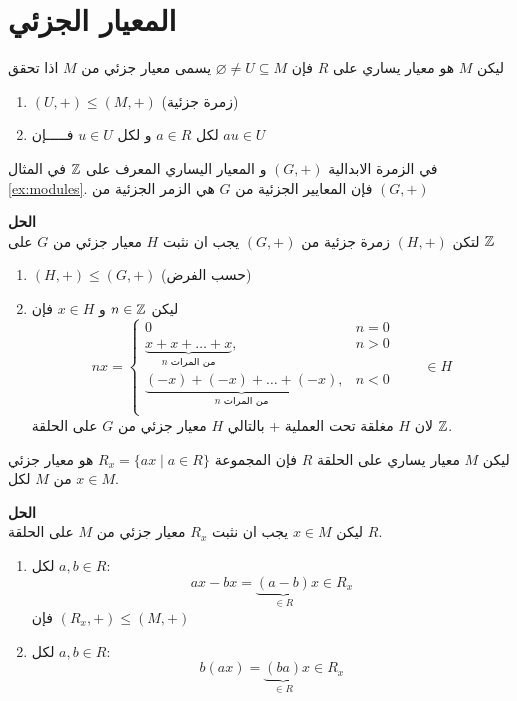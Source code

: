 \section{المعيار الجزئي}
\begin{definition}
  ليكن $M$ هو معيار يساري على $R$ فإن $\varnothing\neq U\subseteq M$ يسمى معيار جزئي من $M$ اذا تحقق
  \begin{enumerate}
  	\item $(U, +) \leq (M, +)$ (زمرة جزئية)
  	\item  لكل $a\in R$ و لكل $u\in U$ فـــــإن $au\in U$
  \end{enumerate}
\end{definition}

\begin{example}\label{ex:submodules}
	في الزمرة الابدالية $(G,+)$ و المعيار اليساري المعرف على $\mathbb{Z}$ في المثال \ref{ex:modules}. فإن المعايير الجزئية من $G$ هي الزمر الجزئية من $(G,+)$
	\end{example}
	\noindent
	\textbf{الحل}\\
	\noindent
	لتكن $(H,+)$ زمرة جزئية من $(G,+)$ يجب ان نثبت $H$ معيار جزئي من $G$ على $\mathbb{Z}$  
	\begin{enumerate}
		\item $(H, +) \leq (G, +)$ (حسب الفرض)
		\item ليكن $n\in\mathbb{Z}$ و $x\in H$ فإن 
		\[
		nx = 
		\begin{cases}
			0 & n=0 \\
			\underbrace{x+x+\dots+x}_{\text{$n$ من المرات}}, & n>0\\
			\underbrace{(-x)+(-x)+\dots+(-x)}_{\text{$n$ من المرات}}, & n<0\\
		\end{cases}
		\qquad \in H
		\]
		لان $H$ مغلقة تحت العملية + بالتالي $H$ معيار جزئي من $G$ على الحلقة $\mathbb{Z}$.
	\end{enumerate}

	\begin{example}
		 ليكن $M$ معيار يساري على الحلقة $R$ فإن المجموعة $R_x=\{ax\mid a\in R\}$ هو معيار جزئي من $M$ لكل $x\in M$.
	\end{example}
	\noindent
	\textbf{الحل}\\
	\noindent
	ليكن $x\in M$ يجب ان نثبت $R_x$ معيار جزئي من $M$ على الحلقة $R$.
	\begin{enumerate}
		\item لكل $a,b\in R$:
		\[
		ax - bx = \underbrace{(a-b)}_{\in R} x \in R_x
		\]
		فإن $(R_x,+)\leq (M,+)$
		\item لكل $a,b\in R$:
		\[
		b(ax) = \underbrace{(ba)}_{\in R}x \in R_x
		\]
	\end{enumerate}


